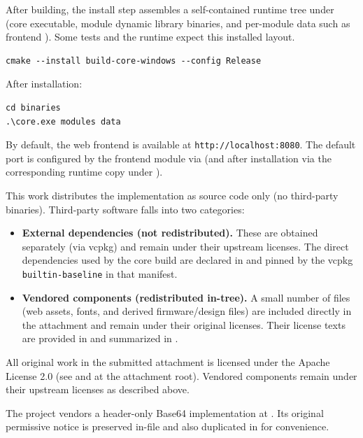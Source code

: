 After building, the install step assembles a self-contained runtime tree under 
(core executable, module dynamic library binaries, and per-module data such as frontend ).
Some tests and the runtime expect this installed layout.

\begin{verbatim}
cmake --install build-core-windows --config Release
\end{verbatim}

After installation:
\begin{verbatim}
cd binaries
.\core.exe modules data
\end{verbatim}
By default, the web frontend is available at \texttt{http://localhost:8080}.
The default port is configured by the frontend module via 
(and after installation via the corresponding runtime copy under ).

This work distributes the implementation as source code only (no third-party binaries).
Third-party software falls into two categories:

\begin{itemize}
    \item \textbf{External dependencies (not redistributed).}
    These are obtained separately (via vcpkg) and remain under their upstream licenses.
    The direct dependencies used by the core build are declared in  and pinned by the vcpkg \texttt{builtin-baseline} in that manifest.
    \item \textbf{Vendored components (redistributed in-tree).}
    A small number of files (web assets, fonts, and derived firmware/design files) are included directly in the attachment and remain under their original licenses.
    Their license texts are provided in  and summarized in .
\end{itemize}

All original work in the submitted attachment is licensed under the Apache License 2.0 (see  and  at the attachment root).
Vendored components remain under their upstream licenses as described above.

The project vendors a header-only Base64 implementation at
.
Its original permissive notice is preserved in-file and also duplicated in  for convenience.

